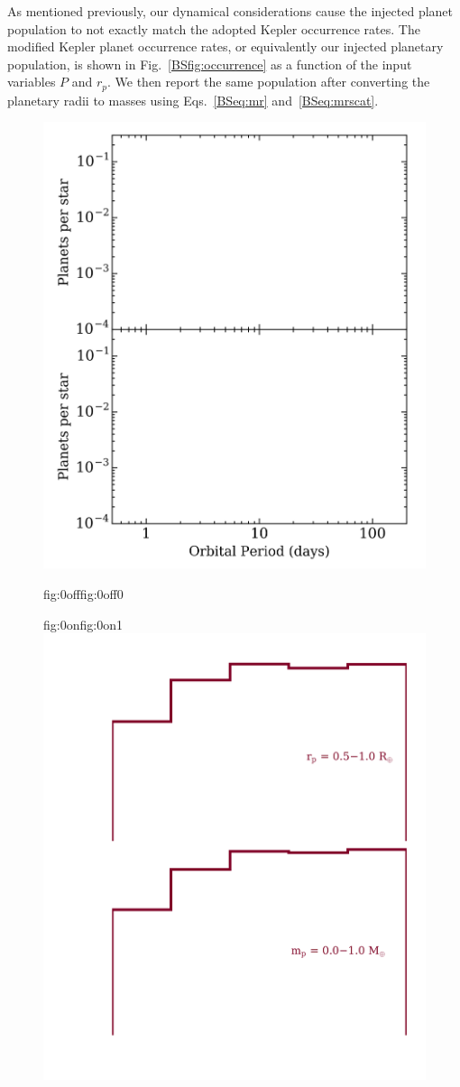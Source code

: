 As mentioned previously,
our dynamical considerations cause the injected planet population to not exactly match the adopted Kepler
occurrence rates. The modified Kepler planet occurrence
rates, or equivalently our injected planetary population, is shown in Fig.~\ref{BSfig:occurrence} as a function
of the input variables $P$ and $r_p$. We then report the same population after converting the planetary radii to
masses using Eqs.~\ref{BSeq:mr} and~\ref{BSeq:mrscat}. \\

\begin{figure}
  \centering
  \includegraphics[width=0.8\hsize]{figures/mpoccurrence_bkgd.png}%
  \hspace{-0.8\hsize}%
  \begin{ocg}{fig:0off}{fig:0off}{0}%
  \end{ocg}%
  \begin{ocg}{fig:0on}{fig:0on}{1}%
    \includegraphics[width=0.8\hsize]{figures/mpoccurrence_0.png}%

\end{ocg}
\end{figure}
